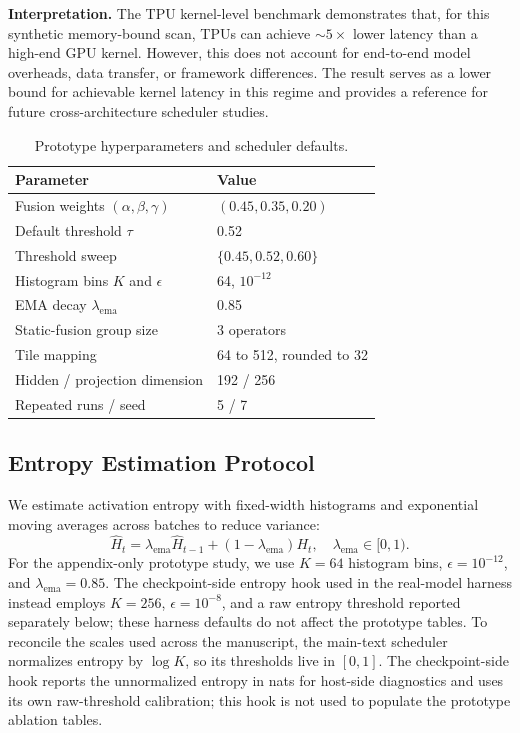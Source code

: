 \noindent\textbf{Interpretation.} The TPU kernel-level benchmark demonstrates that, for this synthetic memory-bound scan, TPUs can achieve $\sim5\times$ lower latency than a high-end GPU kernel. However, this does not account for end-to-end model overheads, data transfer, or framework differences. The result serves as a lower bound for achievable kernel latency in this regime and provides a reference for future cross-architecture scheduler studies.

\begin{table}[!t]
\centering
\caption{Prototype hyperparameters and scheduler defaults.}
\label{tab:prototype_hparams}
\small
\begin{tabular}{ll}
\toprule
Parameter & Value \\
\midrule
Fusion weights \((\alpha, \beta, \gamma)\) & \((0.45, 0.35, 0.20)\) \\
Default threshold \(\tau\) & 0.52 \\
Threshold sweep & \(\{0.45, 0.52, 0.60\}\) \\
Histogram bins \(K\) and \(\epsilon\) & 64, \(10^{-12}\) \\
EMA decay \(\lambda_{\mathrm{ema}}\) & 0.85 \\
Static-fusion group size & 3 operators \\
Tile mapping & 64 to 512, rounded to 32 \\
Hidden / projection dimension & 192 / 256 \\
Repeated runs / seed & 5 / 7 \\
\bottomrule
\end{tabular}
\end{table}

\subsection{Entropy Estimation Protocol}
We estimate activation entropy with fixed-width histograms and exponential moving averages across batches to reduce variance:
\begin{equation}
  \hat{H}_t = \lambda_{\mathrm{ema}} \hat{H}_{t-1} + (1-\lambda_{\mathrm{ema}}) H_t, \quad \lambda_{\mathrm{ema}} \in [0,1).
\end{equation}
For the appendix-only prototype study, we use \(K=64\) histogram bins, \(\epsilon = 10^{-12}\), and \(\lambda_{\mathrm{ema}} = 0.85\). The checkpoint-side entropy hook used in the real-model harness instead employs \(K=256\), \(\epsilon = 10^{-8}\), and a raw entropy threshold reported separately below; these harness defaults do not affect the prototype tables.
To reconcile the scales used across the manuscript, the main-text scheduler normalizes entropy by \(\log K\), so its thresholds live in \([0,1]\). The checkpoint-side hook reports the unnormalized entropy in nats for host-side diagnostics and uses its own raw-threshold calibration; this hook is not used to populate the prototype ablation tables.

